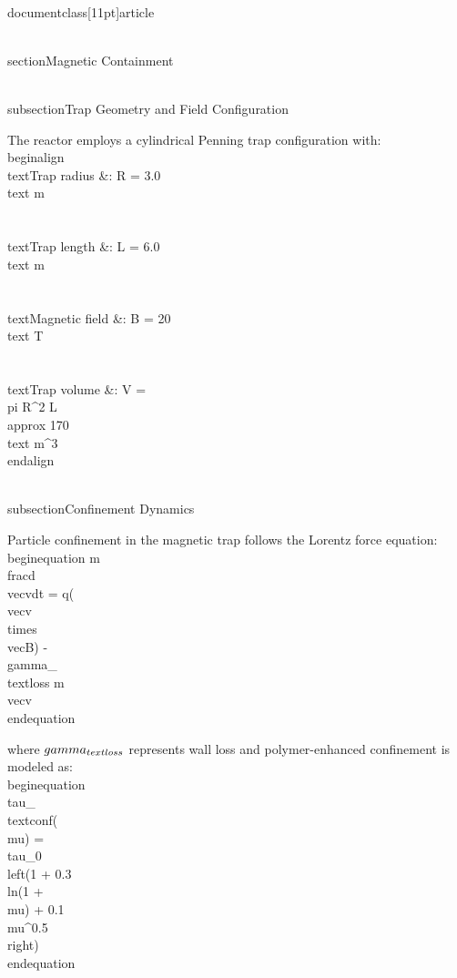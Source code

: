 \\documentclass[11pt]{article}
\begin{document}
\\section{Magnetic Containment}

\\subsection{Trap Geometry and Field Configuration}

The reactor employs a cylindrical Penning trap configuration with:
\\begin{align}
\\text{Trap radius} &: R = 3.0 \\text{ m} \\\\
\\text{Trap length} &: L = 6.0 \\text{ m} \\\\
\\text{Magnetic field} &: B = 20 \\text{ T} \\\\
\\text{Trap volume} &: V = \\pi R^2 L \\approx 170 \\text{ m}^3
\\end{align}

\\subsection{Confinement Dynamics}

Particle confinement in the magnetic trap follows the Lorentz force equation:
\\begin{equation}
m\\frac{d\\vec{v}}{dt} = q(\\vec{v} \\times \\vec{B}) - \\gamma_{\\text{loss}} m\\vec{v}
\\end{equation}

where $\\gamma_{\\text{loss}}$ represents wall loss and polymer-enhanced confinement is modeled as:
\\begin{equation}
\\tau_{\\text{conf}}(\\mu) = \\tau_0 \\left(1 + 0.3 \\ln(1 + \\mu) + 0.1 \\mu^{0.5}\\right)
\\end{equation}
\end{document}
